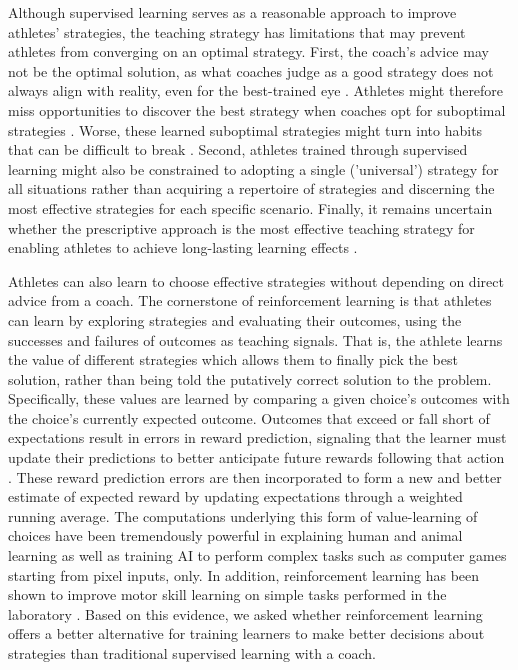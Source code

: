 \documentclass[pdflatex,sn-nature]{sn-jnl}%
\theoremstyle{thmstyleone}%
\theoremstyle{thmstyletwo}%
\theoremstyle{thmstylethree}%
\begin{document}
Although supervised learning serves as a reasonable approach to improve athletes' strategies, the teaching strategy has limitations that may prevent athletes from converging on an optimal strategy. First, the coach's advice may not be the optimal solution, as what coaches judge as a good strategy does not always align with reality, even for the best-trained eye \cite{supej_impact_2019, cochrum_visual_2021}. Athletes might therefore miss opportunities to discover the best strategy when coaches opt for suboptimal strategies \cite{grayloooooong, grayshort}. Worse, these learned suboptimal strategies might turn into habits that can be difficult to break \cite{popp_effect_2020}. Second, athletes trained through supervised learning might also be constrained to adopting a single ('universal') strategy for all situations rather than acquiring a repertoire of strategies and discerning the most effective strategies for each specific scenario. Finally, it remains uncertain whether the prescriptive approach is the most effective teaching strategy for enabling athletes to achieve long-lasting learning effects \cite{wulf_instructions_1997, hodges_role_1999, williams_practice_2005,williams_effective_2023}. 

Athletes can also learn to choose effective strategies without depending on direct advice from a coach. The cornerstone of reinforcement learning \cite{sutton_reinforcement_2018} is that athletes can learn by exploring strategies and evaluating their outcomes, using the successes and failures of outcomes as teaching signals. That is, the athlete learns the value of different strategies which allows them to finally pick the best solution, rather than being told the putatively correct solution to the problem. Specifically, these values are learned by comparing a given choice's outcomes with the choice's currently expected outcome. Outcomes that exceed or fall short of expectations result in errors in reward prediction, signaling that the learner must update their predictions to better anticipate future rewards following that action \cite{rescorla_theory_1972}. These reward prediction errors are then incorporated to form a new and better estimate of expected reward by updating expectations through a weighted running average. The computations underlying this form of value-learning of choices have been tremendously powerful in explaining human and animal learning \cite{waelti_dopamine_2001, schultz_neural_1997, pessiglione_dopamine-dependent_2006,lee_neural_2012, law_reinforcement_2009, tobler_human_2006} as well as training AI to perform complex tasks such as computer games starting from pixel inputs, only\cite{mnih_human-level_2015}. In addition, reinforcement learning has been shown to improve motor skill learning on simple tasks performed in the laboratory \cite{lior_shmuelof_overcoming_2012, abe_reward_2011, truong_error-based_2023, hasson_reinforcement_2015}. Based on this evidence, we asked whether reinforcement learning offers a better alternative for training learners to make better decisions about strategies than traditional supervised learning with a coach. 
\end{document}
